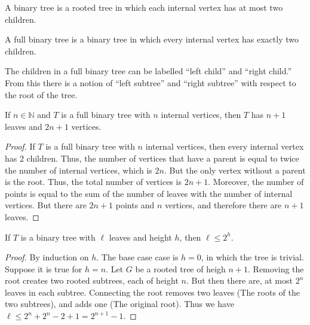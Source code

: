             \begin{definition}
                A binary tree is a rooted tree in which each internal
                vertex has at most two children.
            \end{definition}
            \begin{definition}
                A full binary tree is a binary tree in which every
                internal vertex has exactly two children.
            \end{definition}
            \begin{remark}
                The children in a full binary tree can be labelled
                ``left child'' and ``right child.'' From this there
                is a notion of ``left subtree'' and ``right subtree''
                with respect to the root of the tree.
            \end{remark}
            \begin{theorem}
                If $n\in\mathbb{N}$ and $T$ is a full binary tree with
                $n$ internal vertices,
                then $T$ has $n+1$ leaves and $2n+1$ vertices.
            \end{theorem}
            \begin{proof}
                If $T$ is a full binary tree with $n$ internal vertices,
                then every internal vertex has 2 children. Thus, the
                number of vertices that have a parent is equal to twice
                the number of internal vertices, which is $2n$. But the
                only vertex without a parent is the root. Thus, the
                total number of vertices is $2n+1$. Moreover, the number
                of points is equal to the sum of the number of leaves
                with the number of internal vertices. But there are
                $2n+1$ points and $n$ vertices, and therefore there
                are $n+1$ leaves.
            \end{proof}
            \begin{theorem}
                If $T$ is a binary tree with $\ell$ leaves and height
                $h$, then $\ell\leq2^{h}$.
            \end{theorem}
            \begin{proof}
                By induction on $h$. The base case case is $h=0$, in
                which the tree is trivial. Suppose it is true for
                $h=n$. Let $G$ be a rooted tree of heigh $n+1$.
                Removing the root creates two rooted subtrees,
                each of height $n$. But then there are, at most
                $2^{n}$ leaves in each subtree. Connecting the root
                removes two leaves (The roots of the two subtrees),
                and adds one (The original root). Thus we have
                $\ell\leq{2^{n}+2^{n}-2+1}=2^{n+1}-1$.
            \end{proof}
